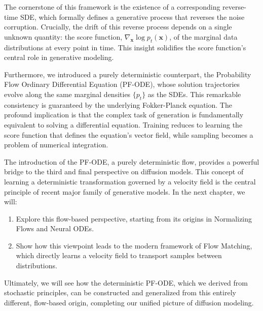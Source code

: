 The cornerstone of this framework is the existence of a corresponding reverse-time SDE, which formally defines a generative process that reverses the noise corruption. Crucially, the drift of this reverse process depends on a single unknown quantity: the score function, $\nabla_{\mathbf{x}}\log{p_{t}(\mathbf{x})}$, of the marginal data distributions at every point in time. This insight solidifies the score function's central role in generative modeling.

Furthermore, we introduced a purely deterministic counterpart, the Probability Flow Ordinary Differential Equation (PF-ODE), whose solution trajectories evolve along the same marginal densities $\{p_{t}\}$ as the SDEs. This remarkable consistency is guaranteed by the underlying Fokker-Planck equation. The profound implication is that the complex task of generation is fundamentally equivalent to solving a differential equation. Training reduces to learning the score function that defines the equation's vector field, while sampling becomes a problem of numerical integration.

The introduction of the PF-ODE, a purely deterministic flow, provides a powerful bridge to the third and final perspective on diffusion models. This concept of learning a deterministic transformation governed by a velocity field is the central principle of recent major family of generative models. In the next chapter, we will:
\begin{enumerate}
    \item Explore this flow-based perspective, starting from its origins in Normalizing Flows and Neural ODEs.
    \item Show how this viewpoint leads to the modern framework of Flow Matching, which directly learns a velocity field to transport samples between distributions.
\end{enumerate}

Ultimately, we will see how the deterministic PF-ODE, which we derived from stochastic principles, can be constructed and generalized from this entirely different, flow-based origin, completing our unified picture of diffusion modeling.






